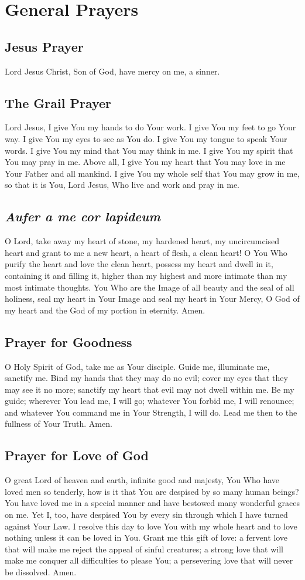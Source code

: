 \documentclass[12pt]{article}
\newcommand{\prayersection}[1]{\section{#1}}
\newcommand{\prayertitle}[1]{\subsection{#1}}
\newcommand{\emphasis}[1]{\emph{#1}}
\newcommand{\emphasis}[1]{\textsl{#1}}
\newcommand{\foreign}[1]{\emphasis{#1}}
\begin{document}
\newpage

\prayersection{General Prayers}
\prayertitle{Jesus Prayer}
\label{prayer:Jesus}
Lord Jesus Christ, Son of God, have mercy on me, a sinner.

\prayertitle{The Grail Prayer}
Lord Jesus,
I give You my hands to do Your work.
I give You my feet to go Your way.
I give You my eyes to see as You do.
I give You my tongue to speak Your words.
I give You my mind that You may think in me.
I give You my spirit that You may pray in me.
Above all, I give You my heart that You may love in me Your Father and all mankind.
I give You my whole self that You may grow in me, so that it is You, Lord Jesus,
Who live and work and pray in me.

\prayertitle{\foreign{Aufer a me cor lapideum}}
\label{prayer:take_heart_of_stone}
O Lord, take away my heart of stone, my hardened heart, my uncircumcised heart and grant to me a new heart, a heart of flesh, a clean heart!
O You Who purify the heart and love the clean heart, possess my heart and dwell in it, containing it and filling it, higher than my highest and more intimate than my most intimate thoughts.
You Who are the Image of all beauty and the seal of all holiness, seal my heart in Your Image and seal my heart in Your Mercy, O God of my heart and the God of my portion in eternity.
Amen.

\prayertitle{Prayer for Goodness}
O Holy Spirit of God, take me as Your disciple.
Guide me, illuminate me, sanctify me.
Bind my hands that they may do no evil;
cover my eyes that they may see it no more;
sanctify my heart that evil may not dwell within me.
Be my guide;
wherever You lead me, I will go;
whatever You forbid me, I will renounce;
and whatever You command me in Your Strength, I will do.
Lead me then to the fullness of Your Truth.
Amen.

\prayertitle{Prayer for Love of God}
O great Lord of heaven and earth, infinite good and majesty, You Who have loved men so tenderly, how is it that You are despised by so many human beings?
You have loved me in a special manner and have bestowed many wonderful graces on me.
Yet I, too, have despised You by every sin through which I have turned against Your Law.
I resolve this day to love You with my whole heart and to love nothing unless it can be loved in You.
Grant me this gift of love:
a fervent love that will make me reject the appeal of sinful creatures;
a strong love that will make me conquer all difficulties to please You;
a persevering love that will never be dissolved.
Amen.
\end{document}
